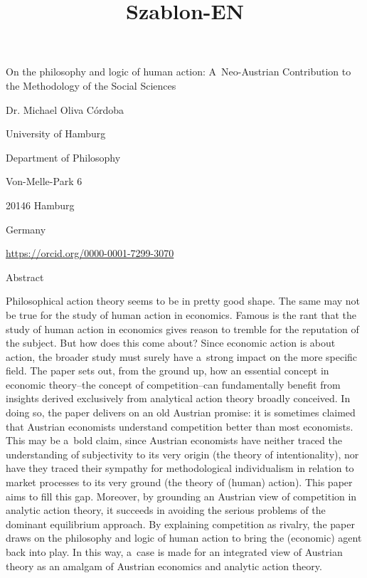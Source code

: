 \setcounter{secnumdepth}{1}





\title{Szablon-EN}



On the philosophy and logic of human action: A~Neo-Austrian Contribution to the Methodology of the Social Sciences





Dr. Michael Oliva Córdoba



University of Hamburg



Department of Philosophy



Von-Melle-Park 6



20146 Hamburg



Germany



\href{mailto:michael.oliva-cordoba@uni-hamburg.de}{}



\url{https://orcid.org/0000-0001-7299-3070}



Abstract



Philosophical action theory seems to be in pretty good shape. The same may not be true for the study of human action in economics. Famous is the rant that the study of human action in economics gives reason to tremble for the reputation of the subject. But how does this come about? Since economic action is about action, the broader study must surely have a~strong impact on the more specific field. The paper sets out, from the ground up, how an essential concept in economic theory–the concept of competition–can fundamentally benefit from insights derived exclusively from analytical action theory broadly conceived. In doing so, the paper delivers on an old Austrian promise: it is sometimes claimed that Austrian economists understand competition better than most economists. This may be a~bold claim, since Austrian economists have neither traced the understanding of subjectivity to its very origin (the theory of intentionality), nor have they traced their sympathy for methodological individualism in relation to market processes to its very ground (the theory of (human) action). This paper aims to fill this gap. Moreover, by grounding an Austrian view of competition in analytic action theory, it succeeds in avoiding the serious problems of the dominant equilibrium approach. By explaining competition as rivalry, the paper draws on the philosophy and logic of human action to bring the (economic) agent back into play. In this way, a~case is made for an integrated view of Austrian theory as an amalgam of Austrian economics and analytic action theory.




